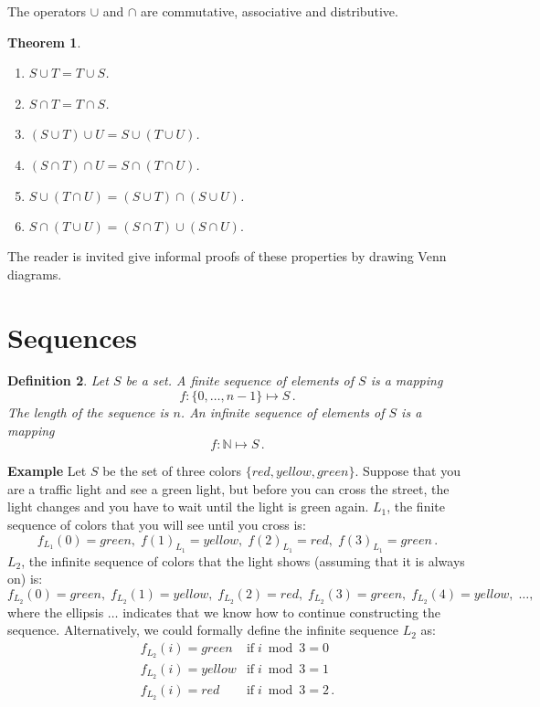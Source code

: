 \documentclass[12pt,a4paper]{article}
\newtheorem{theorem}{Theorem}
\newtheorem{definition}[theorem]{Definition}
\newenvironment{example}{\textbf{Example}}{}
\begin{document}
The operators $\cup$ and $\cap$ are commutative, associative and distributive.

\begin{theorem}\mbox{}
\begin{enumerate}
\item $S \cup T = T \cup S$.
\item $S \cap T = T \cap S$.
\item $(S \cup T) \cup U = S \cup (T\cup U)$.
\item $(S \cap T) \cap U = S \cap (T\cap U)$.
\item $S \cup (T\cap U) = (S \cup T) \cap (S \cup U)$.
\item $S \cap (T\cup U) = (S \cap T) \cup (S \cap U).$
\end{enumerate}
\end{theorem}
The reader is invited give informal proofs of these properties by drawing Venn diagrams.


\section{Sequences}

\begin{definition}\label{def.sequences}
Let $S$ be a set. A \emph{finite sequence of elements of $S$} is a mapping
\[
f:\{0,\ldots,n-1\}\mapsto S\,.
\]
The \emph{length} of the sequence is $n$. An \emph{infinite sequence of elements of $S$} is a mapping
\[
f:\mathbb{N}\mapsto S\,.
\]
\end{definition}

\begin{example}
Let $S$ be the set of three colors $\{\mathit{red},
\mathit{yellow}, \mathit{green}\}$. Suppose that you are a traffic light and see a green light, but before you can cross the street, the light changes and you have to wait until the light is green again. $L_1$, the finite sequence of colors that you will see until you cross is:
\begin{displaymath}
f_{L_1}(0)=\mathit{green},\; f(1)_{L_1}=\mathit{yellow},\; f(2)_{L_1}=\mathit{red},\; f(3)_{L_1}=\mathit{green}\,.
\end{displaymath}
$L_2$, the infinite sequence of colors that the light shows (assuming that it is always on) is:
\begin{displaymath}
f_{L_2}(0)=\mathit{green},\; f_{L_2}(1)=\mathit{yellow},\; f_{L_2}(2)=\mathit{red},\; f_{L_2}(3)=\mathit{green},\; f_{L_2}(4)=\mathit{yellow},\; \ldots,
\end{displaymath}
where the ellipsis $\ldots$ indicates that we know how to continue
constructing the sequence. Alternatively, we could formally define the infinite
sequence $L_2$ as:
\begin{displaymath}
\begin{array}{ll}
f_{L_2}(i)=\mathit{green}&\mathrm{if}\; i\bmod 3 = 0\\
f_{L_2}(i)=\mathit{yellow}&\mathrm{if}\; i\bmod 3 = 1\\
f_{L_2}(i)=\mathit{red}&\mathrm{if}\; i\bmod 3 = 2\,.
\end{array}
\end{displaymath}
\end{example}
\end{document}
